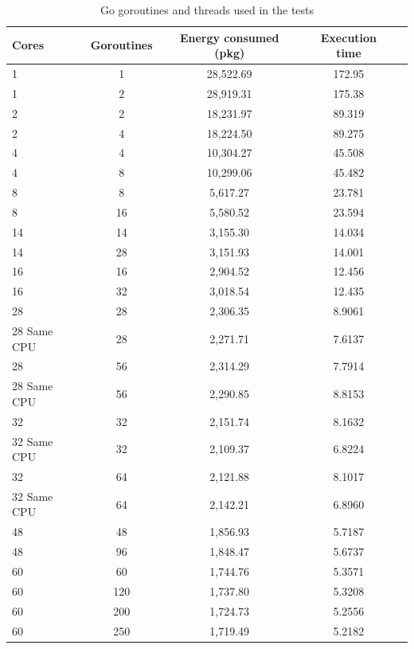 \begin{table}[ht]
  \centering
  \begin{tabular}{lcccc}
    \toprule
    Cores & Goroutines & Energy consumed (pkg) & Execution time \\
    \midrule
    1             & 1          &  28,522.69     &   172.95  \\ 
    1             & 2          &  28,919.31     &   175.38  \\ 
    2             & 2          &  18,231.97     &   89.319  \\
    2             & 4          &  18,224.50     &   89.275  \\
    4             & 4          &  10,304.27     &   45.508  \\
    4             & 8          &  10,299.06     &   45.482  \\
    8             & 8          &  5,617.27      &   23.781  \\
    8             & 16         &  5,580.52      &   23.594  \\
    14            & 14         &  3,155.30      &   14.034  \\
    14            & 28         &  3,151.93      &   14.001  \\
    16            & 16         &  2,904.52      &   12.456  \\
    16            & 32         &  3,018.54      &   12.435  \\
    28            & 28         &  2,306.35      &   8.9061  \\
    28 Same CPU   & 28         &  2,271.71      &   7.6137  \\
    28            & 56         &  2,314.29      &   7.7914  \\
    28 Same CPU   & 56         &  2,290.85      &   8.8153  \\
    32            & 32         &  2,151.74      &   8.1632  \\
    32 Same CPU   & 32         &  2,109.37      &   6.8224  \\
    32            & 64         &  2,121.88      &   8.1017  \\
    32 Same CPU   & 64         &  2,142.21      &   6.8960  \\
    48            & 48         &  1,856.93      &   5.7187  \\
    48            & 96         &  1,848.47      &   5.6737  \\
    60            & 60         &  1,744.76      &   5.3571  \\
    60            & 120        &  1,737.80      &   5.3208  \\
    60            & 200        &  1,724.73      &   5.2556  \\
    60            & 250        &  1,719.49      &   5.2182  \\
    \bottomrule
  \end{tabular}
  \caption{Go goroutines and threads used in the tests}
  \label{tab:go-routines-cores}
\end{table}


